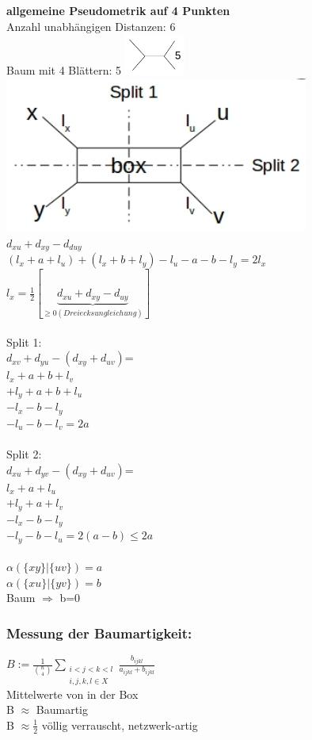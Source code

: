 \textbf{allgemeine Pseudometrik auf 4 Punkten}\\
Anzahl unabhängigen Distanzen: 6\\
Baum mit 4 Blättern: 5
\includegraphics[width=0.15\textwidth]{lectures/161216/pix/4.jpg}\\
\includegraphics[width=0.75\textwidth]{lectures/161216/pix/5.jpg}\\
$d_{xu} + d_{xy} - d_{duy}$\\
$(l_x+a+l_u)+(l_x+b+l_y)-l_u-a-b-l_y=2l_x$\\
$l_x=\frac{1}{2}[\underbrace{d_{xu}+d_{xy}-d_{uy}}_{\geq 0 (Dreiecksungleichung)}]$\\\\
Split 1:\\
$d_{xv}+d_{yu}-(d_{xy}+d_{uv})$=\\
$l_x+a+b+l_v$\\
$+l_y+a+b+l_u$\\
$-l_x-b-l_y$\\
$-l_u-b-l_v=2a$\\\\
Split 2:\\
$d_{xu}+d_{yv}-(d_{xy}+d_{uv})$=\\
$l_x+a+l_u$\\
$+l_y+a+l_v$\\
$-l_x-b-l_y$\\
$-l_y-b-l_u=2(a-b) \leq 2a$\\\\

$\alpha(\{xy\}|\{uv\})=a$\\
$\alpha(\{xu\}|\{yv\})=b$\\
Baum $\Rightarrow$ b=0

\subsubsection{Messung der Baumartigkeit:}
$B:=\frac{1}{\binom{n}{4}} \displaystyle\sum_{\substack{i<j<k<l \\ i,j,k,l \in X}} \frac{b_{ijkl}}{a_{ijkl} + b_{ijkl}}$\\
Mittelwerte von in der Box\\
B $\approx$ Baumartig\\
B $\approx \frac{1}{2}$ völlig verrauscht, netzwerk-artig\\

